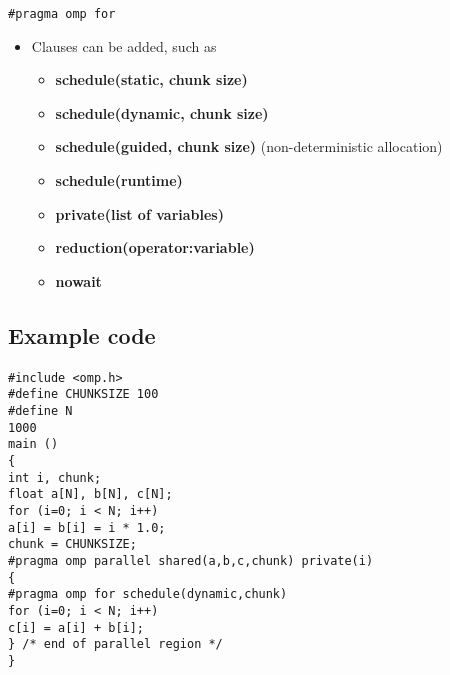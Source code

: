 \documentclass[%
oneside,                 %
final,                   %
10pt]{article}
\begin{document}
\noindent
\begin{verbatim}
#pragma omp for
\end{verbatim}
\begin{itemize}
\item Clauses can be added, such as
\begin{itemize}

  \item \textbf{schedule(static, chunk size)}

  \item \textbf{schedule(dynamic, chunk size)} 

  \item \textbf{schedule(guided, chunk size)} (non-deterministic allocation)

  \item \textbf{schedule(runtime)}

  \item \textbf{private(list of variables)}

  \item \textbf{reduction(operator:variable)}

  \item \textbf{nowait}
\end{itemize}

\noindent
\end{itemize}

\noindent



\subsection*{Example code}

\paragraph{}
\begin{verbatim}
#include <omp.h>
#define CHUNKSIZE 100
#define N
1000
main ()
{
int i, chunk;
float a[N], b[N], c[N];
for (i=0; i < N; i++)
a[i] = b[i] = i * 1.0;
chunk = CHUNKSIZE;
#pragma omp parallel shared(a,b,c,chunk) private(i)
{
#pragma omp for schedule(dynamic,chunk)
for (i=0; i < N; i++)
c[i] = a[i] + b[i];
} /* end of parallel region */
}
\end{verbatim}
\end{document}
